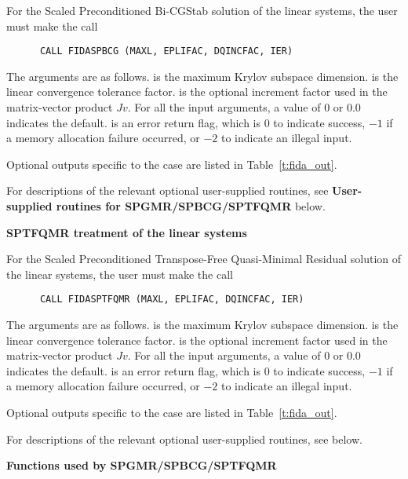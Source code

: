 \begin{Steps}
  For the Scaled Preconditioned Bi-CGStab solution of the linear systems,
  the user must make the call
\begin{verbatim}
      CALL FIDASPBCG (MAXL, EPLIFAC, DQINCFAC, IER)
\end{verbatim}
  The arguments are as follows.
   is the maximum Krylov subspace dimension.
   is the linear convergence tolerance factor.
   is the optional increment factor used in the matrix-vector product
  $Jv$.
  For all the input arguments, a value of 0 or $0.0$ indicates the default.
   is an error return flag, which is $0$ to indicate success, $-1$
  if a memory allocation failure occurred, or $-2$ to indicate an illegal input.
  
  Optional outputs specific to the {\spbcg} case are listed in
  Table~\ref{t:fida_out}.

  For descriptions of the relevant optional user-supplied routines, see 
  {\bf User-supplied routines for SPGMR/SPBCG/SPTFQMR} below.


  {\s}{\p} {\bf SPTFQMR treatment of the linear systems}
  
  For the Scaled Preconditioned Transpose-Free Quasi-Minimal Residual solution of
  the linear systems, the user must make the call
\begin{verbatim}
      CALL FIDASPTFQMR (MAXL, EPLIFAC, DQINCFAC, IER)
\end{verbatim}
  The arguments are as follows.
   is the maximum Krylov subspace dimension.
   is the linear convergence tolerance factor.
   is the optional increment factor used in the matrix-vector product
  $Jv$.
  For all the input arguments, a value of 0 or $0.0$ indicates the default.
   is an error return flag, which is $0$ to indicate success, $-1$
  if a memory allocation failure occurred, or $-2$ to indicate an illegal input.
  
  Optional outputs specific to the {\sptfqmr} case are listed in
  Table~\ref{t:fida_out}.

  For descriptions of the relevant optional user-supplied routines, see 
  below.

  
  {\s}{\p} {\bf Functions used by SPGMR/SPBCG/SPTFQMR}
  

\end{Steps}
